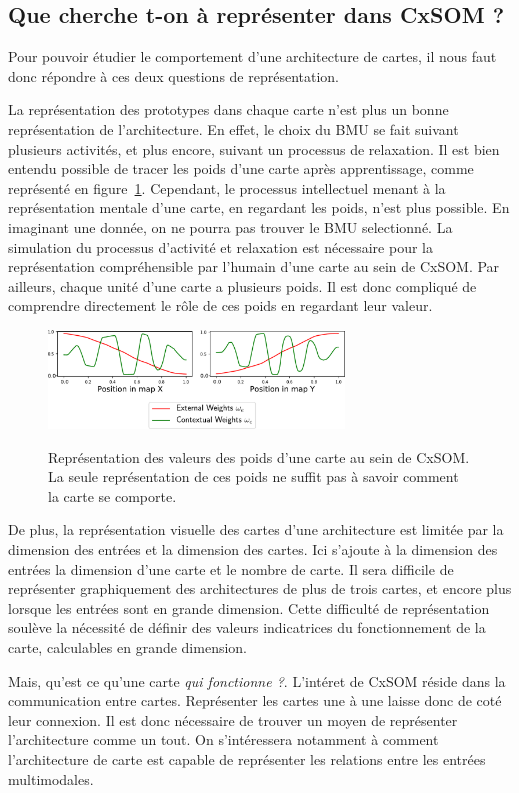 \subsection{Que cherche t-on à représenter dans CxSOM ?}

Pour pouvoir étudier le comportement d'une architecture de cartes, il nous faut donc répondre à ces deux questions de représentation. 

La représentation des prototypes dans chaque carte n'est plus un bonne représentation de l'architecture.
En effet, le choix du BMU se fait suivant plusieurs activités, et plus encore, suivant un processus de relaxation. Il est bien entendu possible de tracer les poids d'une carte après apprentissage, comme représenté en figure~\ref{fig:weights}. Cependant, le processus intellectuel menant à la représentation mentale d'une carte, en regardant les poids, n'est plus possible. En imaginant une donnée, on ne pourra pas trouver le BMU selectionné. La simulation du processus d'activité et relaxation est nécessaire pour la représentation compréhensible par l'humain d'une carte au sein de CxSOM. Par ailleurs, chaque unité d'une carte a plusieurs poids. Il est donc compliqué de comprendre directement le rôle de ces poids en regardant leur valeur.
\begin{figure}
\centering
\includegraphics[width=0.7\textwidth]{weights_2.pdf}
\label{fig:weights}
\caption{Représentation des valeurs des poids d'une carte au sein de CxSOM. La seule représentation de ces poids ne suffit pas à savoir comment la carte se comporte. }
\end{figure}
De plus, la représentation visuelle des cartes d'une architecture est limitée par la dimension des entrées et la dimension des cartes. Ici s'ajoute à la dimension des entrées la dimension d'une carte et le nombre de carte. Il sera difficile de représenter graphiquement des architectures de plus de trois cartes, et encore plus lorsque les entrées sont en grande dimension. Cette difficulté de représentation soulève la nécessité de définir des valeurs indicatrices du fonctionnement de la carte, calculables en grande dimension.

Mais, qu'est ce qu'une carte \emph{qui fonctionne ?}. L'intéret de CxSOM réside dans la communication entre cartes. Représenter les cartes une à une laisse donc de coté leur connexion. Il est donc nécessaire de trouver un moyen de représenter l'architecture comme un tout. On s'intéressera notamment à comment l'architecture de carte est capable de représenter les relations entre les entrées multimodales.

